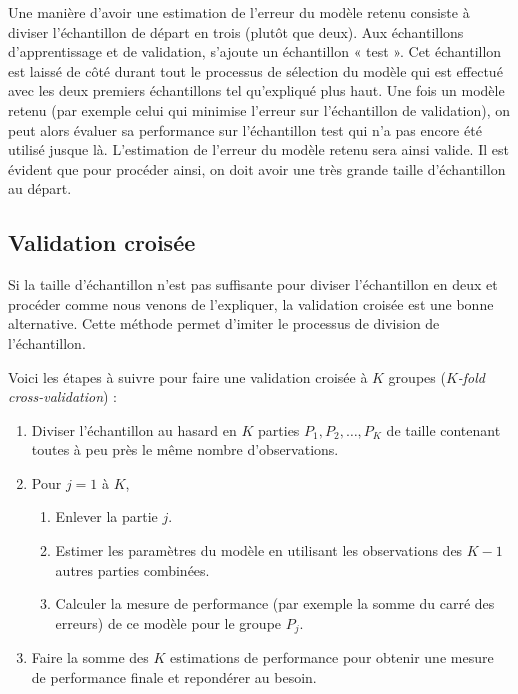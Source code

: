 \documentclass[
  11pt,
  letterpaper,
]{book}
\providecommand{\tightlist}{%
  \setlength{\itemsep}{0pt}\setlength{\parskip}{0pt}}
\theoremstyle{definition}
\theoremstyle{definition}
\theoremstyle{definition}
\theoremstyle{remark}
\begin{document}
Une manière d'avoir une estimation de l'erreur du modèle retenu consiste à diviser l'échantillon de départ en trois (plutôt que deux). Aux échantillons d'apprentissage et de validation, s'ajoute un échantillon « test ». Cet échantillon est laissé de côté durant tout le processus de sélection du modèle qui est effectué avec les deux premiers échantillons tel qu'expliqué plus haut. Une fois un modèle retenu (par exemple celui qui minimise l'erreur sur l'échantillon de validation), on peut alors évaluer sa performance sur l'échantillon test qui n'a pas encore été utilisé jusque là. L'estimation de l'erreur du modèle retenu sera ainsi valide. Il est évident que pour procéder ainsi, on doit avoir une très grande taille d'échantillon au départ.

\hypertarget{validation-croisuxe9e}{%
\subsection{Validation croisée}\label{validation-croisuxe9e}}

Si la taille d'échantillon n'est pas suffisante pour diviser l'échantillon en deux et procéder comme nous venons de l'expliquer, la validation croisée est une bonne alternative. Cette méthode permet d'imiter le processus de division de l'échantillon.

Voici les étapes à suivre pour faire une validation croisée à \(K\) groupes (\emph{\(K\)-fold cross-validation}) :

\begin{enumerate}
\def\labelenumi{\arabic{enumi}.}
\tightlist
\item
  Diviser l'échantillon au hasard en \(K\) parties \(P_1, P_2, \ldots, P_K\) de taille contenant toutes à peu près le même nombre d'observations.
\item
  Pour \(j = 1\) à \(K\),

  \begin{enumerate}
  \def\labelenumii{\roman{enumii}.}
  \tightlist
  \item
    Enlever la partie \(j\).
  \item
    Estimer les paramètres du modèle en utilisant les observations des \(K-1\) autres parties combinées.
  \item
    Calculer la mesure de performance (par exemple la somme du carré des erreurs) de ce modèle pour le groupe \(P_j\).
  \end{enumerate}
\item
  Faire la somme des \(K\) estimations de performance pour obtenir une mesure de performance finale et repondérer au besoin.
\end{enumerate}
\end{document}
